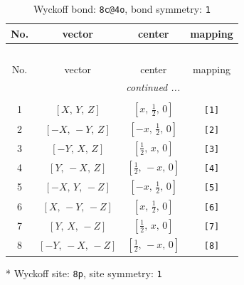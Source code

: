\documentclass[fleqn,8pt]{jsarticle}
\begin{document}
\renewcommand{\arraystretch}{1.2}
\begin{longtable}{cccc}
\caption{Wyckoff bond: {\tt 8c@4o}, bond symmetry: {\tt 1}}
 \\
 \hline \hline
No. & vector & center & mapping \\ \hline \endfirsthead

\multicolumn{3}{l}{\tablename\ \thetable{}} \\
 \hline \hline
No. & vector & center & mapping \\ \hline \endhead

 \hline \hline
\multicolumn{3}{r}{\footnotesize\it continued ...} \\ \endfoot

 \hline \hline
\multicolumn{3}{r}{} \\ \endlastfoot

1 & $\left[ X,\, Y,\, Z \right]$ & $\left[ x,\, \frac{1}{2},\, 0 \right]$ & {\tt [1]} \\ \hline
2 & $\left[ - X,\, - Y,\, Z \right]$ & $\left[ - x,\, \frac{1}{2},\, 0 \right]$ & {\tt [2]} \\ \hline
3 & $\left[ - Y,\, X,\, Z \right]$ & $\left[ \frac{1}{2},\, x,\, 0 \right]$ & {\tt [3]} \\ \hline
4 & $\left[ Y,\, - X,\, Z \right]$ & $\left[ \frac{1}{2},\, - x,\, 0 \right]$ & {\tt [4]} \\ \hline
5 & $\left[ - X,\, Y,\, - Z \right]$ & $\left[ - x,\, \frac{1}{2},\, 0 \right]$ & {\tt [5]} \\ \hline
6 & $\left[ X,\, - Y,\, - Z \right]$ & $\left[ x,\, \frac{1}{2},\, 0 \right]$ & {\tt [6]} \\ \hline
7 & $\left[ Y,\, X,\, - Z \right]$ & $\left[ \frac{1}{2},\, x,\, 0 \right]$ & {\tt [7]} \\ \hline
8 & $\left[ - Y,\, - X,\, - Z \right]$ & $\left[ \frac{1}{2},\, - x,\, 0 \right]$ & {\tt [8]} \\
\end{longtable}
* Wyckoff site: {\tt 8p}, site symmetry: {\tt 1}
\renewcommand{\arraystretch}{1.2}
\end{document}
